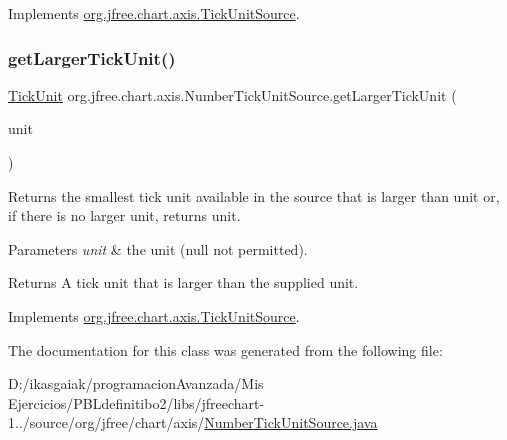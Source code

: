 Implements \mbox{\hyperlink{interfaceorg_1_1jfree_1_1chart_1_1axis_1_1_tick_unit_source_a875d23e3610749f233950f61a855360d}{org.\+jfree.\+chart.\+axis.\+Tick\+Unit\+Source}}.

\mbox{\label{classorg_1_1jfree_1_1chart_1_1axis_1_1_number_tick_unit_source_a9194262fa7438a0f037a343f7de51eab}} 
\subsubsection{\texorpdfstring{get\+Larger\+Tick\+Unit()}{getLargerTickUnit()}}
{\footnotesize\ttfamily \mbox{\hyperlink{classorg_1_1jfree_1_1chart_1_1axis_1_1_tick_unit}{Tick\+Unit}} org.\+jfree.\+chart.\+axis.\+Number\+Tick\+Unit\+Source.\+get\+Larger\+Tick\+Unit (\begin{DoxyParamCaption}\item[{\mbox{\hyperlink{classorg_1_1jfree_1_1chart_1_1axis_1_1_tick_unit}{Tick\+Unit}}}]{unit }\end{DoxyParamCaption})}

Returns the smallest tick unit available in the source that is larger than {\ttfamily unit} or, if there is no larger unit, returns {\ttfamily unit}.


\begin{DoxyParams}{Parameters}
{\em unit} & the unit ({\ttfamily null} not permitted).\\
\hline
\end{DoxyParams}
\begin{DoxyReturn}{Returns}
A tick unit that is larger than the supplied unit. 
\end{DoxyReturn}


Implements \mbox{\hyperlink{interfaceorg_1_1jfree_1_1chart_1_1axis_1_1_tick_unit_source_ada1fecd32d2e0ff584a7d2a55ffc349a}{org.\+jfree.\+chart.\+axis.\+Tick\+Unit\+Source}}.



The documentation for this class was generated from the following file\+:\begin{DoxyCompactItemize}
\item 
D\+:/ikasgaiak/programacion\+Avanzada/\+Mis Ejercicios/\+P\+B\+Ldefinitibo2/libs/jfreechart-\/1../source/org/jfree/chart/axis/\mbox{\hyperlink{_number_tick_unit_source_8java}{Number\+Tick\+Unit\+Source.\+java}}\end{DoxyCompactItemize}
